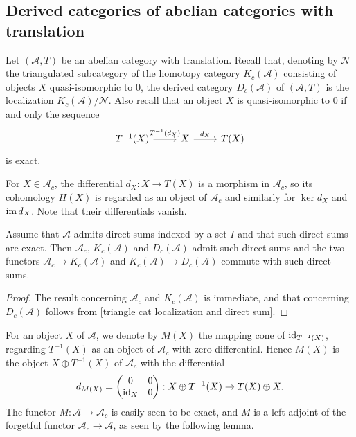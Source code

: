 \subsection{Derived categories of abelian categories with translation}
Let $(\mathcal{A},T)$ be an abelian category with translation. Recall  that, denoting by $\mathcal{N}$ the triangulated subcategory of the homotopy category $K_c(\mathcal{A})$ consisting of objects $X$ quasi-isomorphic to $0$, the derived category $D_c(\mathcal{A})$ of $(\mathcal{A},T)$ is the localization $K_c(\mathcal{A})/\mathcal{N}$. Also recall that an object $X$ is quasi-isomorphic to $0$ if and only the sequence
\[\begin{tikzcd}
T^{-1}(X)\ar[r,"{T^{-1}(d_X)}"]&X\ar[r,"d_X"]&T(X)
\end{tikzcd}\]
is exact.\par
For $X\in\mathcal{A}_c$, the differential $d_X:X\to T(X)$ is a morphism in $\mathcal{A}_c$, so its cohomology $H(X)$ is regarded as an object of $\mathcal{A}_c$ and similarly for $\ker d_X$ and $\operatorname{im} d_X$. Note that their differentials vanish.

\begin{proposition}\label{abelian translation derive direct sum}
Assume that $\mathcal{A}$ admits direct sums indexed by a set $I$ and that such direct sums are exact. Then $\mathcal{A}_c$, $K_c(\mathcal{A})$ and $D_c(\mathcal{A})$ admit such direct sums and the two functors $\mathcal{A}_c\to K_c(\mathcal{A})$ and $K_c(\mathcal{A})\to D_c(\mathcal{A})$ commute with such direct sums.
\end{proposition}
\begin{proof}
The result concerning $\mathcal{A}_c$ and $K_c(\mathcal{A})$ is immediate, and that concerning $D_c(\mathcal{A})$ follows from \cref{triangle cat localization and direct sum}.
\end{proof}

For an object $X$ of $\mathcal{A}$, we denote by $M(X)$ the mapping cone of $\operatorname{id}_{T^{-1}(X)}$, regarding $T^{-1}(X)$ as an object of $\mathcal{A}_c$ with zero differential. Hence $M(X)$ is the object $X\oplus T^{-1}(X)$ of $\mathcal{A}_c$ with the differential
\[d_{M(X)}=\begin{pmatrix}
0&0\\
\operatorname{id}_X&0
\end{pmatrix}:X\oplus T^{-1}(X)\to T(X)\oplus X.\]
The functor $M:\mathcal{A}\to\mathcal{A}_c$ is easily seen to be exact, and $M$ is a left adjoint of the forgetful functor $\mathcal{A}_c\to\mathcal{A}$, as seen by the following lemma.

